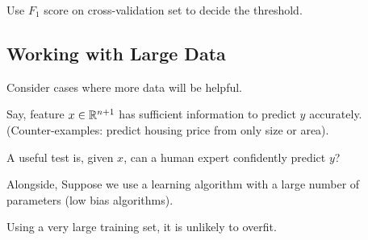 Use $F_1$ score on cross-validation set to decide the threshold.

\subsection{Working with Large Data}
Consider cases where more data will be helpful.

Say, feature $x \in \mathbb{R}^{n+1}$
has sufficient information to predict $y$ accurately. (Counter-examples: predict
housing price from only size or area).

A useful test is, given $x$, can a human
expert confidently predict $y$?

Alongside, Suppose we use a learning algorithm with a large number of parameters
(low bias algorithms).

Using a very large training set, it is unlikely to overfit.

